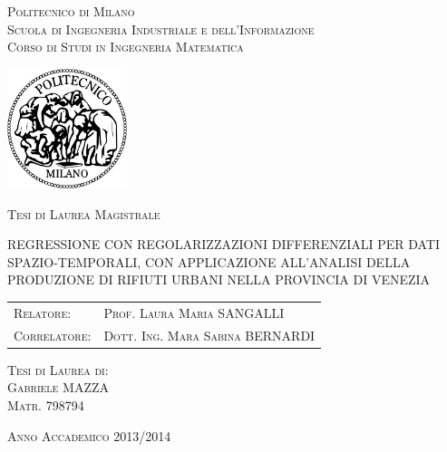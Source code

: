 \documentclass[a4paper,11pt,twoside,openright]{book}							%
\date{28 Luglio 2014}
\author{Gabriele Mazza}%
\title{}
\newenvironment{changemargin}[2]{%
 \begin{list}{}{%
  \setlength{\topsep}{0pt}%
  \setlength{\leftmargin}{#1}%
  \setlength{\rightmargin}{#2}%
  \setlength{\listparindent}{\parindent}%
  \setlength{\itemindent}{\parindent}%
  \setlength{\parsep}{\parskip}%
 }%
\item[]}{\end{list}}
\begin{document}
\begin{changemargin}{-1.3cm}{-3cm}
\thispagestyle{empty}
\begin{center}
\LARGE{\textsc{Politecnico di Milano}}\\
\vspace{5mm}
\large{\textsc{Scuola di Ingegneria Industriale e dell'Informazione}}\\
\vspace{3mm}
\large{\textsc{Corso di Studi in Ingegneria Matematica}}\\
\vspace{8mm}
\end{center}
\begin{center}%
\includegraphics[width=35mm]{Immagini/Logo.png}
\end{center}
\vspace{1mm}
\begin{center}
\large{\textsc{Tesi di Laurea Magistrale}}
\end{center}
\vspace{20mm}

\begin{center}
\Large \scshape REGRESSIONE CON REGOLARIZZAZIONI DIFFERENZIALI PER DATI SPAZIO-TEMPORALI, CON APPLICAZIONE ALL'ANALISI DELLA PRODUZIONE DI RIFIUTI URBANI NELLA PROVINCIA DI VENEZIA
\end{center}
\vspace{20mm}

\begin{flushleft}
\begin{tabular}{l l }
\textsc{Relatore}:    & \textsc{Prof. Laura Maria SANGALLI} \\
\textsc{Correlatore}: & \textsc{Dott. Ing. Mara Sabina BERNARDI}
\end{tabular}
\end{flushleft}
\vspace{9mm}
\begin{flushright}
\textsc{Tesi di Laurea di:} \\ 
\textsc{Gabriele MAZZA} \\
\textsc{Matr. 798794}
\end{flushright}
\vspace{12mm}
\begin{center}
{\large{\textsc{Anno Accademico 2013/2014}}}
\end{center}
\end{changemargin}
\end{document}
